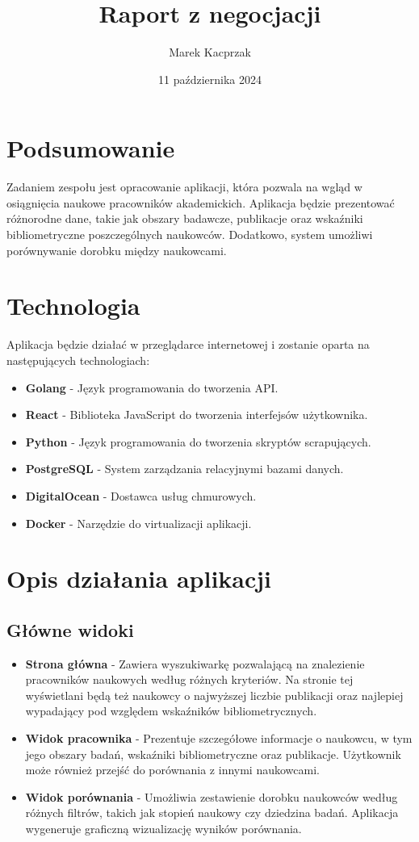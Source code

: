 \documentclass{article}
\title{Raport z negocjacji}
\author{Marek Kacprzak}
\date{11 października 2024}
\begin{document}
\maketitle

\tableofcontents

\section{Podsumowanie}
Zadaniem zespołu jest opracowanie aplikacji, która pozwala na wgląd w osiągnięcia naukowe pracowników akademickich. Aplikacja będzie prezentować różnorodne dane, takie jak obszary badawcze, publikacje oraz wskaźniki bibliometryczne poszczególnych naukowców. Dodatkowo, system umożliwi porównywanie dorobku między naukowcami.

\section{Technologia}
Aplikacja będzie działać w przeglądarce internetowej i zostanie oparta na następujących technologiach:
\begin{itemize}
  \item \textbf{Golang} - Język programowania do tworzenia API.
  \item \textbf{React} - Biblioteka JavaScript do tworzenia interfejsów użytkownika.
  \item \textbf{Python} - Język programowania do tworzenia skryptów scrapujących.
  \item \textbf{PostgreSQL} - System zarządzania relacyjnymi bazami danych.
  \item \textbf{DigitalOcean} - Dostawca usług chmurowych.
  \item \textbf{Docker} - Narzędzie do virtualizacji aplikacji.
\end{itemize}

\section{Opis działania aplikacji}
\subsection{Główne widoki}
\begin{itemize}
  \item \textbf{Strona główna} - Zawiera wyszukiwarkę pozwalającą na znalezienie pracowników naukowych według różnych kryteriów. Na stronie tej wyświetlani będą też naukowcy o najwyższej liczbie publikacji oraz najlepiej wypadający pod względem wskaźników bibliometrycznych.
  \item \textbf{Widok pracownika} - Prezentuje szczegółowe informacje o naukowcu, w tym jego obszary badań, wskaźniki bibliometryczne oraz publikacje. Użytkownik może również przejść do porównania z innymi naukowcami.
  \item \textbf{Widok porównania} - Umożliwia zestawienie dorobku naukowców według różnych filtrów, takich jak stopień naukowy czy dziedzina badań. Aplikacja wygeneruje graficzną wizualizację wyników porównania.
\end{itemize}
\end{document}
